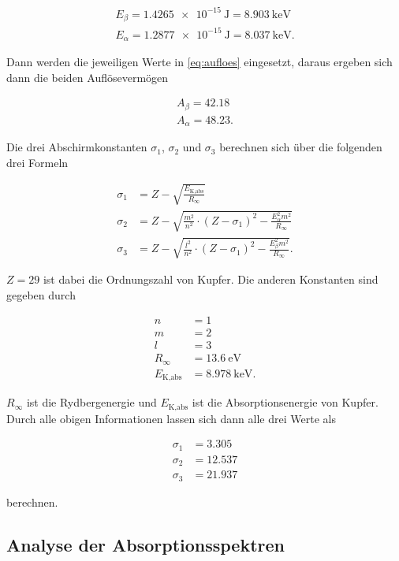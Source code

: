 \begin{align*}
    E_ \beta  = \SI{1.4265e-15}{\joule} = \SI{8.903}{\kilo\electronvolt}\\
    E_ \alpha = \SI{1.2877e-15}{\joule} = \SI{8.037}{\kilo\electronvolt}.
\end{align*}

Dann werden die jeweiligen Werte in \eqref{eq:aufloes} eingesetzt, daraus ergeben sich dann die beiden Auflösevermögen

\begin{align*}
    A_ \beta  = 42.18\\
    A_ \alpha = 48.23.
\end{align*}

Die drei Abschirmkonstanten $\sigma_1$, $\sigma_2$ und $\sigma_3$ berechnen sich über die folgenden drei Formeln

\begin{align*}
    \sigma_1 &= Z - \sqrt{\frac{E_\text{K,abs}}{R_\infty}}\\
    \sigma_2 &= Z - \sqrt{\frac{m^2}{n^2} \cdot \left(Z - \sigma_1\right)^2 - \frac{E_ \alpha ^2 m^2}{R_\infty}}\\
    \sigma_3 &= Z - \sqrt{\frac{l^2}{n^2} \cdot \left(Z - \sigma_1\right)^2 - \frac{E_ \beta ^2 m^2}{R_\infty}}.
\end{align*}

$Z = 29$ ist dabei die Ordnungszahl von Kupfer.
Die anderen Konstanten sind gegeben durch

\begin{align*}
    n &= 1\\
    m &= 2\\
    l &= 3\\
    R_\infty &= \SI{13.6}{\electronvolt}\\
    E_\text{K,abs} &= \SI{8.978}{\kilo\electronvolt}.
\end{align*}

$R_\infty$ ist die Rydbergenergie und $E_\text{K,abs}$ ist die Absorptionsenergie von Kupfer. \cite{V602} \cite{absorption}
Durch alle obigen Informationen lassen sich dann alle drei Werte als 

\begin{align}
    \sigma_1 &= 3.305\\
    \sigma_2 &= 12.537\\
    \sigma_3 &= 21.937
\end{align}

berechnen.

\subsection{Analyse der Absorptionsspektren}
\label{ssec:3}

